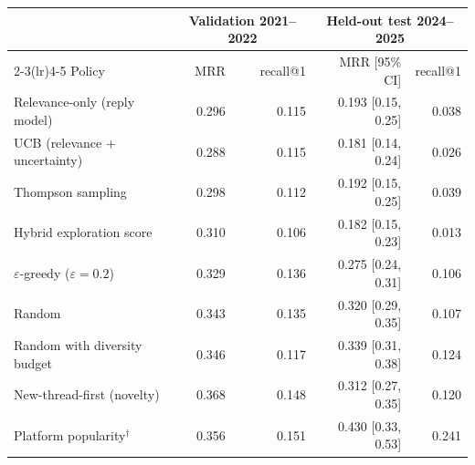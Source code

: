 \begin{tabular}{lrrrr}\toprule
 & \multicolumn{2}{c}{Validation 2021--2022} & \multicolumn{2}{c}{Held-out test 2024--2025}\\
\cmidrule(lr){2-3}\cmidrule(lr){4-5}
Policy & MRR & recall@1 & MRR [95\% CI] & recall@1\\\midrule
Relevance-only (reply model) & 0.296 & 0.115 & 0.193 [0.15, 0.25] & 0.038\\
UCB (relevance + uncertainty) & 0.288 & 0.115 & 0.181 [0.14, 0.24] & 0.026\\
Thompson sampling & 0.298 & 0.112 & 0.192 [0.15, 0.25] & 0.039\\
Hybrid exploration score & 0.310 & 0.106 & 0.182 [0.15, 0.23] & 0.013\\
$\varepsilon$-greedy ($\varepsilon=0.2$) & 0.329 & 0.136 & 0.275 [0.24, 0.31] & 0.106\\
Random & 0.343 & 0.135 & 0.320 [0.29, 0.35] & 0.107\\
Random with diversity budget & 0.346 & 0.117 & 0.339 [0.31, 0.38] & 0.124\\
New-thread-first (novelty) & 0.368 & 0.148 & 0.312 [0.27, 0.35] & 0.120\\
Platform popularity$^\dagger$ & 0.356 & 0.151 & 0.430 [0.33, 0.53] & 0.241\\
\bottomrule
\end{tabular}
